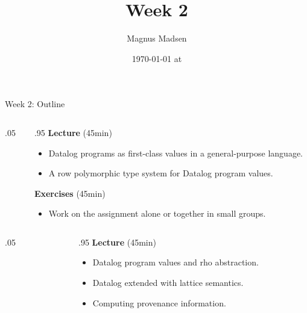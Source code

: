 

\title{Week 2}
\date{\today{} at \currenttime{}}
\author{Magnus Madsen}



\maketitle

\begin{frame}{Week 2: Outline}
\begin{columns}
\begin{column}{.05\textwidth}
\end{column}
\begin{column}{.95\textwidth}
    \footnotesize
\textbf{Lecture} (45min)  \vspace{-2mm}
\begin{itemize}
    \setlength\itemsep{-0.5em}
    \item Datalog programs as first-class values in a general-purpose language.
    \item A row polymorphic type system for Datalog program values.
\end{itemize}
\textbf{Exercises} (45min) \vspace{-2mm}
\begin{itemize}
    \item Work on the assignment alone or together in small groups.
\end{itemize}
\end{column}
\end{columns}

\medskip
\medskip
\medskip

\begin{columns}
\color{gray}
\begin{column}{.05\textwidth}
\end{column}
\begin{column}{.95\textwidth}
\footnotesize
\textbf{Lecture} (45min) \vspace{-2mm}
\begin{itemize}
    \color{gray}
    \setlength\itemsep{-0.5em}
    \item Datalog program values and rho abstraction.
    \item Datalog extended with lattice semantics.
    \item Computing provenance information.
\end{itemize}
\end{column}
\end{columns}
\end{frame}

